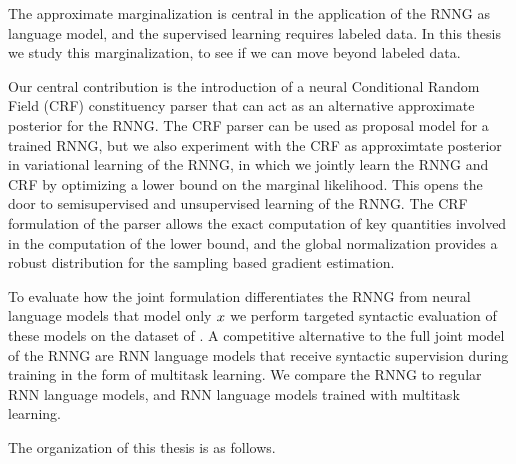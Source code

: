 The approximate marginalization is central in the application of the RNNG as language model, and the supervised learning requires labeled data. In this thesis we study this marginalization, to see if we can move beyond labeled data.

Our central contribution is the introduction of a neural Conditional Random Field (CRF) constituency parser that can act as an alternative approximate posterior for the RNNG. The CRF parser can be used as proposal model for a trained RNNG, but we also experiment with the CRF as approximtate posterior in variational learning of the RNNG, in which we jointly learn the RNNG and CRF by optimizing a lower bound on the marginal likelihood. This opens the door to semisupervised and unsupervised learning of the RNNG. The CRF formulation of the parser allows the exact computation of key quantities involved in the computation of the lower bound, and the global normalization provides a robust distribution for the sampling based gradient estimation.

To evaluate how the joint formulation differentiates the RNNG from neural language models that model only $x$ we perform targeted syntactic evaluation of these models on the dataset of \citep{linzen2018targeted}. A competitive alternative to the full joint model of the RNNG are RNN language models that receive syntactic supervision during training in the form of multitask learning. We compare the RNNG to regular RNN language models, and RNN language models trained with multitask learning.

The organization of this thesis is as follows.

